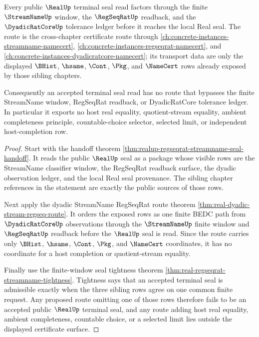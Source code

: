 \begin{theorem}
\label{thm:real-terminal-seal-sibling-route}
Every public $\RealUp$ terminal seal read factors through the finite
$\StreamNameUp$ window, the $\RegSeqRatUp$ readback, and the
$\DyadicRatCoreUp$ tolerance ledger before it reaches the local Real seal.
The route is the cross-chapter certificate route through
\autoref{ch:concrete-instances-streamname-namecert},
\autoref{ch:concrete-instances-regseqrat-namecert}, and
\autoref{ch:concrete-instances-dyadicratcore-namecert}; its transport data
are only the displayed $\BHist$, $\hsame$, $\Cont$, $\Pkg$, and $\NameCert$
rows already exposed by those sibling chapters.

Consequently an accepted terminal seal read has no route that bypasses the
finite StreamName window, RegSeqRat readback, or DyadicRatCore tolerance
ledger. In particular it exports no host real equality, quotient-stream
equality, ambient completeness principle, countable-choice selector, selected
limit, or independent host-completion row.
\end{theorem}
\begin{proof}
Start with the handoff theorem
\autoref{thm:realup-regseqrat-streamname-seal-handoff}. It reads the public
$\RealUp$ seal as a package whose visible rows are the StreamName classifier
window, the RegSeqRat readback surface, the dyadic observation ledger, and
the local Real seal provenance. The sibling chapter references in the
statement are exactly the public sources of those rows.

Next apply the dyadic StreamName RegSeqRat route theorem
\autoref{thm:real-dyadic-stream-regseq-route}. It orders the exposed rows as
one finite BEDC path from $\DyadicRatCoreUp$ observations through the
$\StreamNameUp$ finite window and $\RegSeqRatUp$ readback before the
$\RealUp$ seal is read. Since the route carries only $\BHist$, $\hsame$,
$\Cont$, $\Pkg$, and $\NameCert$ coordinates, it has no coordinate for a host
completion or quotient-stream equality.

Finally use the finite-window seal tightness theorem
\autoref{thm:real-regseqrat-streamname-tightness}. Tightness says that an
accepted terminal seal is admissible exactly when the three sibling rows
agree on one common finite request. Any proposed route omitting one of those
rows therefore fails to be an accepted public $\RealUp$ terminal seal, and
any route adding host real equality, ambient completeness, countable choice,
or a selected limit lies outside the displayed certificate surface.
\end{proof}

